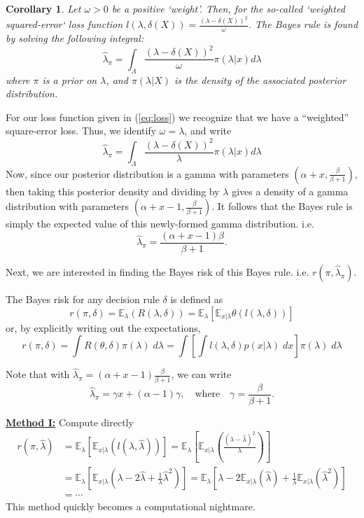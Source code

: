 \documentclass[11pt]{report}
\newtheorem{corollary}{Corollary}
\begin{document}
\begin{corollary}
Let $\omega >0$ be a positive `weight'. Then, for the so-called `weighted squared-error` loss function $l(\lambda, \delta(X)) = \frac{(\lambda - \delta(X))^2}{\omega}$. The Bayes rule is found by solving the following integral:
$$\widehat{\lambda}_\pi = \int_\Lambda\frac{(\lambda - \delta(X))^2}{\omega} \pi(\lambda|x) d\lambda$$
where $\pi$ is a prior on $\lambda$, and $\pi(\lambda|X)$ is the density of the associated posterior distribution. 
\end{corollary}			

For our loss function given in (\ref{eq:loss}) we recognize that we have a ``weighted'' square-error loss. Thus, we identify $\omega = \lambda$, and write  
$$\widehat{\lambda}_\pi = \int_\Lambda\frac{(\lambda - \delta(X))^2}{\lambda} \pi(\lambda|x) d\lambda$$
Now, since our posterior distribution is a gamma with parameters $\left(\alpha+x, \frac{\beta}{\beta+1}\right)$, then taking this posterior density and dividing by $\lambda$ gives a density of a gamma distribution with parameters $\left(\alpha+x-1, \frac{\beta}{\beta+1}\right)$. It follows that the Bayes rule is simply the expected value of this newly-formed gamma distribution. i.e.
$$\widehat{\lambda}_\pi = \frac{(\alpha +x-1)\beta}{\beta+1}.$$
		
Next, we are interested in finding the Bayes risk of this Bayes rule. i.e. $r(\pi, \widehat{\lambda}_\pi)$. 
		
The Bayes risk for any decision rule $\delta$ is defined as 
		$$r(\pi, \delta) = \mathbb{E}_\lambda(R(\lambda,\delta)) = \mathbb{E}_\lambda\left[\mathbb{E}_{x|\lambda}\theta\left(l(\lambda, \delta)\right) \right]$$
		or, by explicitly writing out the expectations,
		$$r(\pi, \delta) = \int R(\theta,\delta) \pi(\lambda)\; d\lambda = \int\left[ \int l(\lambda,\delta)p(x|\lambda) \;dx\right] \pi(\lambda)\; d\lambda$$
		

Note that with $\widehat{\lambda}_\pi = (\alpha +x-1)\frac{\beta}{\beta+1}$, we can write	
$$\widehat{\lambda}_\pi = \gamma x + (\alpha-1)\gamma,\quad \text{where} \quad \gamma = \frac{\beta}{\beta+1}.$$


\underline{\textbf{Method I:}} Compute directly \newline
		\begin{align*}
		r\left(\pi, \widehat{\lambda}\right)
		&  = \mathbb{E}_\lambda\left[\mathbb{E}_{x|\lambda}\left(l(\lambda, \widehat{\lambda})\right) \right] 
		   = \mathbb{E}_\lambda\left[\mathbb{E}_{x|\lambda}\left(\frac{(\lambda-\widehat{\lambda})^2}{\lambda}\right) \right] \\
		&  = \mathbb{E}_\lambda\left[\mathbb{E}_{x|\lambda}\left(\lambda - 2\widehat{\lambda} + \frac{1}{\lambda}\widehat{\lambda}^2 \right) \right] 
		   = \mathbb{E}_\lambda\left[\lambda - 2\mathbb{E}_{x|\lambda}\left(\widehat{\lambda}\right) + \frac{1}{\lambda}\mathbb{E}_{x|\lambda}\left(\widehat{\lambda}^2\right)  \right] \\
		& = \cdots
		\end{align*}
This method quickly becomes a computational nightmare. \newline 
\end{document}
